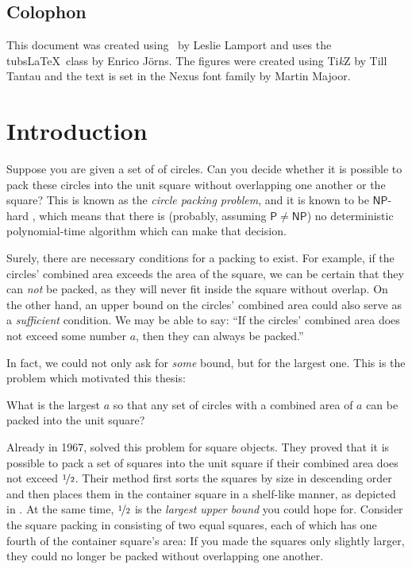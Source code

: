 \documentclass[a4paper,style=print,bibliography=totoc,nexus,lnum,extramargin]{tubsbook}
\begin{document}
\section*{Colophon}

This document was created using \LaTeXe\ by Leslie Lamport and uses the tubs\LaTeX\ class by Enrico Jörns. The figures were created using Ti\textit{k}Z by Till Tantau and the text is set in the Nexus font family by Martin Majoor.

\cleardoublepage
\setcounter{tocdepth}{1}

\tableofcontents
\cleardoublepage

\mainmatter

\chapter{Introduction}

Suppose you are given a set of of circles. Can you decide whether it is possible to pack these circles into the unit square without overlapping one another or the square? This is known as the \emph{circle packing problem}, and it is known to be $\mathsf{NP}$-hard \cite{DFL2010circle}, which means that there is (probably, assuming $\mathsf{P} \ne \mathsf{NP}$) no deterministic polynomial-time algorithm which can make that decision.


Surely, there are necessary conditions for a packing to exist. For example, if the circles' combined area exceeds the area of the square, we can be certain that they can \emph{not} be packed, as they will never fit inside the square without overlap.
On the other hand, an upper bound on the circles' combined area could also serve as a \emph{sufficient} condition. We may be able to say: “If the circles' combined area does not exceed some number $a$, then they can always be packed.”

In fact, we could not only ask for \emph{some} bound, but for the largest one. This is the problem which motivated this thesis:

\begin{problem}\label{prb:1}
    What is the largest $a$ so that any set of circles with a combined area of $a$ can be packed into the unit square?
\end{problem}

Already in 1967, \textcite{MM1967some} solved this problem for square objects. They proved that it is possible to pack a set of squares into the unit square if their combined area does not exceed $\nicefrac{1}{2}$. Their method first sorts the squares by size in descending order and then places them in the container square in a shelf-like manner, as depicted in . At the same time, $\nicefrac{1}{2}$ is the \emph{largest upper bound} you could hope for. Consider the square packing in  consisting of two equal squares, each of which has one fourth of the container square's area: If you made the squares only slightly larger, they could no longer be packed without overlapping one another.
\end{document}

